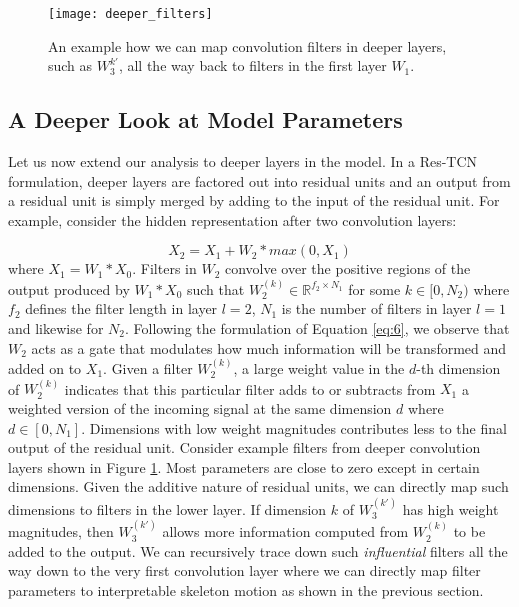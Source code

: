 \documentclass[10pt,twocolumn,letterpaper]{article}
\begin{document}
\begin{figure}[t]
\begin{center}
 \texttt{[image: deeper\_filters]}
\end{center}
 \caption{An example how we can map convolution filters in deeper layers, such as $W_3^{k'}$, all the way back to filters in the first layer $W_1$.}
\label{fig:deep_filter}
\end{figure}

\subsection{A Deeper Look at Model Parameters}
\label{section:deeper}
Let us now extend our analysis to deeper layers in the model. In a Res-TCN formulation, deeper layers are factored out into residual units and an output from a residual unit is simply merged by adding to the input of the residual unit. For example, consider the hidden representation after two convolution layers:

\begin{equation} \label{eq:6}
X_2 = X_1 + W_2*max(0,X_1)
\end{equation}
where $X_1 = W_1*X_0$. Filters in $W_2$ convolve over the positive regions of the output produced by $W_1*X_0$  such that $W^{(k)}_2 \in \mathbb{R}^{f_2 \times N_1}$ for some $k \in [0,N_2)$ where $f_2$ defines the filter length in layer $l=2$, $N_1$ is the number of filters in layer $l=1$ and likewise for $N_2$. Following the formulation of Equation \ref{eq:6}, we observe that $W_2$ acts as a gate that modulates how much information will be transformed and added on to $X_1$. Given a filter $W^{(k)}_2$, a large weight value in the $d$-th dimension of $W^{(k)}_2$ indicates that this particular filter adds to or subtracts from $X_1$ a weighted version of the incoming signal at the same dimension $d$ where $d \in [0,N_1]$. Dimensions with low weight magnitudes contributes less to the final output of the residual unit. Consider example filters from deeper convolution layers shown in Figure \ref{fig:deep_filter}. Most parameters are close to zero except in certain dimensions. Given the additive nature of residual units, we can directly map such dimensions to filters in the lower layer. If dimension $k$ of $W_3^{(k')}$ has high weight magnitudes, then $W_3^{(k')}$ allows more information computed from $W_2^{(k)}$ to be added to the output. We can recursively trace down such \textit{influential} filters all the way down to the very first convolution layer where we can directly map filter parameters to interpretable skeleton motion as shown in the previous section. 
\end{document}
